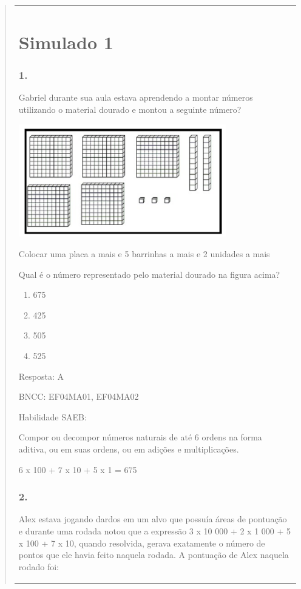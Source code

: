 \begin{enumerate}
\begin{escolha}
\begin{enumerate}
\begin{itemize}
\begin{itemize}
\begin{escolha}
\begin{quote}
\begin{escolha}
{\begin{longtable}[]{@{}l@{}}
\begin{itemize}
\section{Simulado 1}\label{simulado-1}

\subsubsection{1.}\label{section-143}

Gabriel durante sua aula estava aprendendo a montar números utilizando o
material dourado e montou a seguinte número?

\includegraphics[width=3.55128in,height=1.93600in]{media/image142.png}

Colocar uma placa a mais e 5 barrinhas a mais e 2 unidades a mais

Qual é o número representado pelo material dourado na figura acima?

\begin{enumerate}
\def\labelenumi{\alph{enumi})}
\item
  675
\item
  425
\item
  505
\item
  525
\end{enumerate}

Resposta: A

BNCC: EF04MA01, EF04MA02

Habilidade SAEB:

Compor ou decompor números naturais de até 6 ordens na forma aditiva, ou
em suas ordens, ou em adições e multiplicações.

6 x 100 + 7 x 10 + 5 x 1 = 675

\subsubsection{2.}\label{section-144}

Alex estava jogando dardos em um alvo que possuía áreas de pontuação e
durante uma rodada notou que a expressão 3 x 10 000 + 2 x 1 000 + 5 x
100 + 7 x 10, quando resolvida, gerava exatamente o número de pontos que
ele havia feito naquela rodada. A pontuação de Alex naquela rodado foi:


\end{itemize}
\end{longtable}}
\end{escolha}
\end{quote}
\end{escolha}
\end{itemize}
\end{itemize}
\end{enumerate}
\end{escolha}
\end{enumerate}
